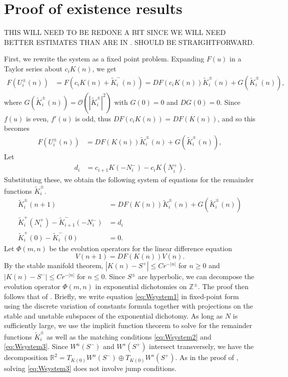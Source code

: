 \documentclass[12pt]{article}
\def\R{{\mathbb R}}
\def\Z{{\mathbb Z}}
\begin{document}
\section{Proof of existence results}

THIS WILL NEED TO BE REDONE A BIT SINCE WE WILL NEED BETTER ESTIMATES THAN ARE IN \cite{Parker2020}. SHOULD BE STRAIGHTFORWARD.

First, we rewrite the system as a fixed point problem. Expanding $F(u)$ in a Taylor series about $c_i K(n)$, we get
\begin{align*}
F(U_i^\pm(n)) &= F(c_i K(n) + \tilde{K}_i^-(n)) = 
D F(c_i K(n)) \tilde{K}_i^\pm(n) + G(\tilde{K}_i^\pm(n)),
\end{align*}
where $G(\tilde{K}_i^\pm(n)) = \mathcal{O}(|\tilde{K}_i^\pm|^2)$ with $G(0) = 0$ and $DG(0) = 0$. Since $f(u)$ is even, $f'(u)$ is odd, thus $D F(c_i K(n)) = D F(K(n))$, and so this becomes
\begin{align*}
F(U_i^\pm(n)) &= 
D F(K(n)) \tilde{K}_i^\pm(n) + G(\tilde{K}_i^\pm(n)),
\end{align*}
Let
\begin{align}\label{didef}
d_i &= c_{i+1} K(-N_i^-) - c_i K(N_i^+).
\end{align}
Substituting these, we obtain the following system of equations for the remainder functions $\tilde{K}_i^\pm$.
\begin{align}
\tilde{K}_i^\pm(n+1) &= D F(K(n)) \tilde{K}_i^\pm(n) + G(\tilde{K}_i^\pm(n)) \label{eq:Wsystem1} \\
\tilde{K}_i^+(N_i^+) - \tilde{K}_{i+1}^-(-N_i^-) &= d_i \label{eq:Wsystem2} \\
\tilde{K}_i^+(0) - \tilde{K}_i^-(0) &= 0. \label{eq:Wsystem3}
\end{align}
Let $\Phi(m, n)$ be the evolution operators for the linear difference equation 
\[
V(n+1) = D F(K(n)) V(n).
\]
By the stable manifold theorem, $|K(n) - S^+| \leq C r^{-|n|}$ for $n \geq 0$ and $|K(n) - S^-| \leq C r^{-|n|}$ for $n \leq 0$. Since $S^\pm$ are hyperbolic, we can decompose the evolution operator $\Phi(m, n)$ in exponential dichotomies on $\Z^\pm$. The proof then follows that of \cite[Theorem 3]{Parker2020}. Briefly, we write equation \cref{eq:Wsystem1} in fixed-point form using the discrete variation of constants formula together with projections on the stable and unstable subspaces of the exponential dichotomy. As long as $N$ is sufficiently large, we use the implicit function theorem to solve for the remainder functions $\tilde{K}_i^\pm$ as well as the matching conditions \cref{eq:Wsystem2} and \cref{eq:Wsystem3}. Since $W^u(S^-)$ and $W^s(S^+)$ intersect transversely, we have the decomposition $\R^2 = T_{K(0)}W^u(S^-)\oplus T_{K(0)}W^s(S^+)$. As in the proof of \cite[Theorem 3]{Parker2020}, solving \cref{eq:Wsystem3} does not involve jump conditions.
\end{document}
